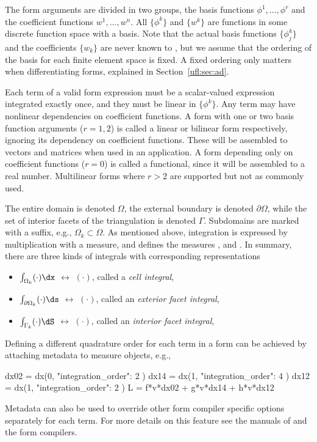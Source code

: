 The form arguments are divided in two groups, the basis functions
$\phi^1,\ldots,\phi^r$ and the coefficient functions $w^1,\ldots,w^n$.
All $\{ \phi^k \}$ and $\{ w^k \}$ are functions in some discrete
function space with a basis.  Note that the actual basis functions $\{
\phi_j^k \}$ and the coefficients $\{ w_k \}$ are never known to
\ufl{}, but we assume that the ordering of the basis for each finite
element space is fixed. A fixed ordering only matters when
differentiating forms, explained in Section~\ref{ufl:sec:ad}.

Each term of a valid form expression must be a scalar-valued
expression integrated exactly once, and they must be linear in $\{
\phi^k \}$.  Any term may have nonlinear dependencies on coefficient
functions.  A form with one or two basis function arguments ($r=1,2$)
is called a linear or bilinear form respectively, ignoring its
dependency on coefficient functions. These will be assembled to
vectors and matrices when used in an application.  A form depending
only on coefficient functions ($r=0$) is called a functional, since it
will be assembled to a real number. Multilinear forms where $r > 2$
are supported but not as commonly used.

The entire domain is denoted $\Omega$, the external boundary is
denoted $\partial\Omega$, while the set of interior facets of the
triangulation is denoted $\Gamma$. Subdomains are marked with a
suffix, e.g., $\Omega_k \subset \Omega$. As mentioned above,
integration is expressed by multiplication with a measure, and \ufl{}
defines the measures ,  and .  In
summary, there are three kinds of integrals with corresponding \ufl{}
representations
\begin{itemize}
\item $\int_{        \Omega_k} (\cdot) \dx$ $\leftrightarrow$  $(\cdot)$, called a \emph{cell integral},
\item $\int_{\partial\Omega_k} (\cdot) \ds$ $\leftrightarrow$  $(\cdot)$, called an \emph{exterior facet integral},
\item $\int_{        \Gamma_k} (\cdot) \dS$ $\leftrightarrow$  $(\cdot)$, called an \emph{interior facet integral},
\end{itemize}
Defining a different quadrature order for each term in a form can be
achieved by attaching metadata to measure objects, e.g.,
\begin{uflcode}
dx02 = dx(0, { "integration_order": 2 })
dx14 = dx(1, { "integration_order": 4 })
dx12 = dx(1, { "integration_order": 2 })
L = f*v*dx02 + g*v*dx14 + h*v*dx12
\end{uflcode}
Metadata can also be used to override other form compiler specific
options separately for each term. For more details on this feature see
the manuals of \ufl{} and the form compilers.


